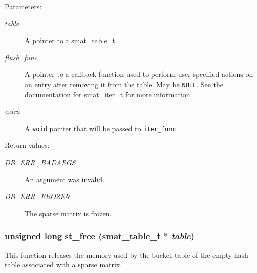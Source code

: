 \begin{Desc}
\item[Parameters:]
\begin{description}
\item[{\em table}]A pointer to a \hyperlink{group__dbprim__smat_a0}{smat\_\-table\_\-t}. \item[{\em flush\_\-func}]A pointer to a callback function used to perform user-specified actions on an entry after removing it from the table. May be {\tt NULL}. See the documentation for \hyperlink{group__dbprim__smat_a4}{smat\_\-iter\_\-t} for more information. \item[{\em extra}]A {\tt void} pointer that will be passed to {\tt iter\_\-func}.\end{description}
\end{Desc}
\begin{Desc}
\item[Return values:]
\begin{description}
\item[{\em DB\_\-ERR\_\-BADARGS}]An argument was invalid. \item[{\em DB\_\-ERR\_\-FROZEN}]The sparse matrix is frozen. \end{description}
\end{Desc}
\hypertarget{group__dbprim__smat_a16}{
\subsubsection[st\_\-free]{\setlength{\rightskip}{0pt plus 5cm}unsigned long st\_\-free (\hyperlink{dbprim_8h_a0}{smat\_\-table\_\-t} $\ast$ {\em table})}}
\label{group__dbprim__smat_a16}


This function releases the memory used by the bucket table of the empty hash table associated with a sparse matrix.

